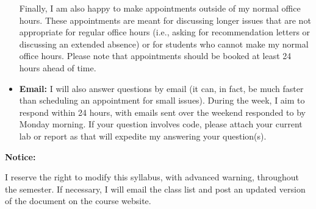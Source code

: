 \documentclass[12pt]{article}
\begin{document}
\begin{itemize}
Finally, I am also happy to make appointments outside of my normal
office hours. These appointments are meant for discussing
longer issues that are not appropriate for regular office hours (i.e., asking
for recommendation letters or discussing an extended absence) or for students
who cannot make my normal office hours. Please note that appointments should
be booked at least 24 hours ahead of time.
\item \textbf{Email:} I will also answer questions by email (it can, in fact,
be much faster than scheduling an appointment for small issues). During the
week, I aim to respond within 24 hours, with emails sent over the weekend
responded to by Monday morning. If your question involves code, please attach
your current lab or report as that will expedite my answering your question(s).
\end{itemize}

\bigskip

\textbf{Notice:} \vspace{6pt}

I reserve the right to modify this syllabus, with advanced warning, throughout
the semester. If necessary, I will email the class list and post an updated
version of the document on the course website.






\end{document}
